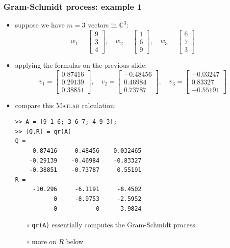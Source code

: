 \documentclass[10pt,hyperref]{beamer}
\newcommand{\CC}{\mathbb{C}}
\newcommand{\Matlab}{\textsc{Matlab}\xspace}
\begin{document}
\begin{frame}[fragile]
\frametitle{Gram-Schmidt process: example 1}

\begin{itemize}
\item suppose we have $m=3$ vectors in $\CC^3$:
\small
    $$w_1 = \begin{bmatrix} 9 \\ 3 \\ 4 \end{bmatrix}, \quad w_2 = \begin{bmatrix} 1 \\ 6 \\ 9 \end{bmatrix}, \quad w_3 = \begin{bmatrix} 6 \\ 7 \\ 3 \end{bmatrix}$$
\normalsize
\item applying the formulas on the previous slide:
\small
    $$v_1 = \begin{bmatrix} 0.87416 \\ 0.29139 \\ 0.38851 \end{bmatrix}, \quad v_2 = \begin{bmatrix} -0.48456 \\ 0.46984 \\ 0.73787 \end{bmatrix}, \quad v_3 = \begin{bmatrix} -0.03247 \\ 0.83327 \\ -0.55191 \end{bmatrix}$$
\normalsize
\item compare this \Matlab calculation:
\begin{Verbatim}[fontsize=\scriptsize]
>> A = [9 1 6; 3 6 7; 4 9 3];
>> [Q,R] = qr(A)
Q =
    -0.87416     0.48456    0.032465
    -0.29139    -0.46984    -0.83327
    -0.38851    -0.73787     0.55191
R =
     -10.296     -6.1191     -8.4502
           0     -8.9753     -2.5952
           0           0     -3.9824
\end{Verbatim}
    \begin{itemize}
    \item[$\circ$] \texttt{qr(A)} essentially computes the Gram-Schmidt process
    \item[$\circ$] more on $R$ below
    \end{itemize}
\end{itemize}
\end{frame}
\end{document}
